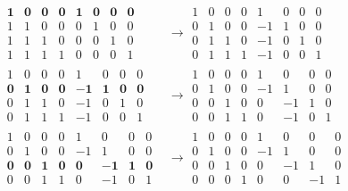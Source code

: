 \documentclass{article}
\begin{document}
\begin{align*}
    \begin{array}{cccc|cccc}
    \mathbf{1} & \mathbf{0} & \mathbf{0} & \mathbf{0} & \mathbf{1} & \mathbf{0} & \mathbf{0} & \mathbf{0} \\
    1 & 1 & 0 & 0 & 0 & 1 & 0 & 0 \\
    1 & 1 & 1 & 0 & 0 & 0 & 1 & 0 \\
    1 & 1 & 1 & 1 & 0 & 0 & 0 & 1 
    \end{array} &\longrightarrow \begin{array}{cccc|cccc}
    1 & 0 & 0 & 0 & 1 & 0 & 0 & 0 \\
    0 & 1 & 0 & 0 & -1 & 1 & 0 & 0 \\
    0 & 1 & 1 & 0 & -1& 0 & 1 & 0 \\
    0 & 1 & 1 & 1 & -1 & 0 & 0 & 1 
    \end{array} \\
    \begin{array}{cccc|cccc}
    1 & 0 & 0 & 0 & 1 & 0 & 0 & 0 \\
    \mathbf{0} & \mathbf{1} & \mathbf{0} & \mathbf{0} & \mathbf{-1} & \mathbf{1} & \mathbf{0} & \mathbf{0} \\
    0 & 1 & 1 & 0 & -1& 0 & 1 & 0 \\
    0 & 1 & 1 & 1 & -1 & 0 & 0 & 1 
    \end{array} &\longrightarrow
    \begin{array}{cccc|cccc}
    1 & 0 & 0 & 0 & 1 & 0 & 0 & 0 \\
    0 & 1 & 0 & 0 & -1 & 1 & 0 & 0 \\
    0 & 0 & 1 & 0 & 0& -1 & 1 & 0 \\
    0 & 0 & 1 & 1 & 0 & -1 & 0 & 1 
    \end{array} \\
    \begin{array}{cccc|cccc}
    1 & 0 & 0 & 0 & 1 & 0 & 0 & 0 \\
    0 & 1 & 0 & 0 & -1 & 1 & 0 & 0 \\
    \mathbf{0} & \mathbf{0} & \mathbf{1} & \mathbf{0} & \mathbf{0}& \mathbf{-1} & \mathbf{1} & \mathbf{0} \\
    0 & 0 & 1 & 1 & 0 & -1 & 0 & 1 
    \end{array} &\longrightarrow
    \begin{array}{cccc|cccc}
    1 & 0 & 0 & 0 & 1 & 0 & 0 & 0 \\
    0 & 1 & 0 & 0 & -1 & 1 & 0 & 0 \\
    0 & 0 & 1 & 0 & 0& -1 & 1 & 0 \\
    0 & 0 & 0 & 1 & 0 & 0 & -1 & 1 
    \end{array}
\end{align*}
\end{document}
